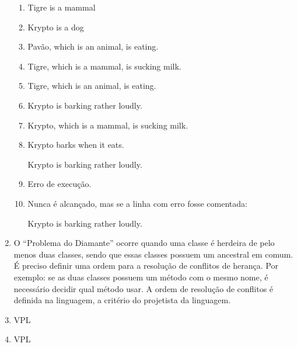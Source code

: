 \documentclass{article}
\begin{document}
\begin{enumerate}
\begin{enumerate}
      \item Tigre is a mammal
      \item Krypto is a dog
      \item Pavão, which is an animal, is eating.
      \item Tigre, which is a mammal, is sucking milk.
      \item Tigre, which is an animal, is eating.
      \item Krypto is barking rather loudly.
      \item Krypto, which is a mammal, is sucking milk.
      \item Krypto barks when it eats.

        Krypto is barking rather loudly.
      \item Erro de execução.
      \item Nunca é alcançado, mas se a linha com erro fosse comentada:

        Krypto is barking rather loudly.
    \end{enumerate}
  \item O “Problema do Diamante” ocorre quando uma classe é herdeira de pelo menos duas classes, sendo que essas classes possuem um ancestral em comum. É preciso definir uma ordem para a resolução de conflitos de herança. Por exemplo: se as duas classes possuem um método com o mesmo nome, é necessário decidir qual método usar. A ordem de resolução de conflitos é definida na linguagem, a critério do projetista da linguagem.
  \item VPL
  \item VPL
\end{enumerate}
\end{document}
